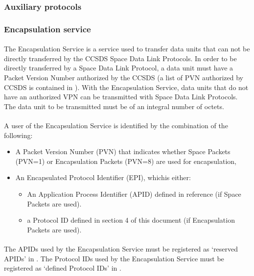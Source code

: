 \subsubsection{Auxiliary protocols}

\subsubsection*{Encapsulation service\cite{ES}}
\paragraph{}The Encapsulation Service is a service used to transfer data units that can not be directly transferred by the CCSDS Space Data Link Protocols. In order to be directly transferred by a Space Data Link Protocol, a data unit must have a Packet Version Number authorized by the CCSDS (a list of PVN authorized by CCSDS is contained in \cite{SANAPVN}). With the Encapsulation Service, data units that do not have an authorized VPN can be transmitted with Space Data Link Protocols. The data unit to be transmitted must be of an integral number of octets.
\paragraph{}A user of the Encapsulation Service is identified by the combination of the following:
\begin{itemize}
\item A Packet Version Number (PVN) that indicates whether Space Packets (PVN=1) or Encapsulation Packets (PVN=8) are used for encapsulation,
\item An Encapsulated Protocol Identifier (EPI), whichis either:
\begin{itemize}
\item An Application Process Identifier (APID) defined in reference (if Space Packets are used).
\item a Protocol ID defined in section 4 of this document (if Encapsulation Packets are used).
\end{itemize}
\end{itemize}
\paragraph{}The APIDs used by the Encapsulation Service must be registered as ‘reserved APIDs’ in \cite{SANAAPID}. The Protocol IDs used by the Encapsulation Service must be registered as ‘defined Protocol IDs’ in \cite{SANAPID}.
